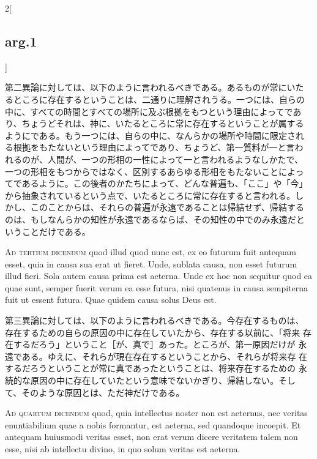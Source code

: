 \documentclass[paper=a4paper,fontsize=10pt,jafontsize=9pt,titlepage]{jlreq}
\begin{document}
\begin{paracol}{2}[\subsection{arg.1}]
\switchcolumn

第二異論に対しては、以下のように言われるべきである。あるものが常にいた
るところに存在するということは、二通りに理解されうる。一つには、自らの
中に、すべての時間とすべての場所に及ぶ根拠をもつという理由によってであ
り、ちょうどそれは、神に、いたるところに常に存在するということが属する
ようにである。もう一つには、自らの中に、なんらかの場所や時間に限定され
る根拠をもたないという理由によってであり、ちょうど、第一質料が一と言わ
れるのが、人間が、一つの形相の一性によって一と言われるようなしかたで、
一つの形相をもつからではなく、区別するあらゆる形相をもたないことによっ
てであるように。この後者のかたちによって、どんな普遍も、「ここ」や「今」
から抽象されているという点で、いたるところに常に存在すると言われる。し
かし、このことからは、それらの普遍が永遠であることは帰結せず、帰結する
のは、もしなんらかの知性が永遠であるならば、その知性の中でのみ永遠だと
いうことだけである。

\switchcolumn*[\subsection{ad.3}]


{\scshape Ad tertium dicendum} quod illud quod nunc est, ex eo futurum
fuit antequam esset, quia in causa sua erat ut fieret. Unde, sublata
causa, non esset futurum illud fieri. Sola autem causa prima est
aeterna. Unde ex hoc non sequitur quod ea quae sunt, semper fuerit
verum ea esse futura, nisi quatenus in causa sempiterna fuit ut essent
futura. Quae quidem causa solus Deus est.

\switchcolumn

第三異論に対しては、以下のように言われるべきである。今存在するものは、
存在するための自らの原因の中に存在していたから、存在する以前に、「将来
存在するだろう」ということ［が、真で］あった。ところが、第一原因だけが
永遠である。ゆえに、それらが現在存在するということから、それらが将来存
在するだろうということが常に真であったということは、将来存在するための
永続的な原因の中に存在していたという意味でないかぎり、帰結しない。そし
て、そのような原因とは、ただ神だけである。

\switchcolumn*[\subsection{ad.4}]


{\scshape Ad quartum dicendum} quod, quia intellectus noster non est
aeternus, nec veritas enuntiabilium quae a nobis formantur, est
aeterna, sed quandoque incoepit. Et antequam huiusmodi veritas esset,
non erat verum dicere veritatem talem non esse, nisi ab intellectu
divino, in quo solum veritas est aeterna.


\end{paracol}
\end{document}
